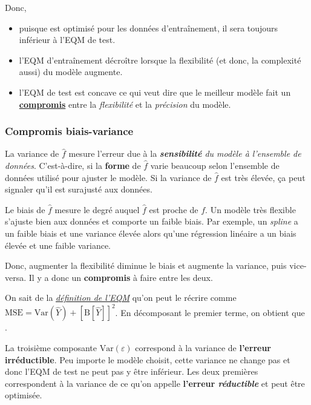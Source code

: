 \documentclass[french]{article}
\begin{document}
\begin{multicols*}{2}
Donc, 
\begin{itemize}
	\item	puisque est optimisé pour les données d'entraînement, il sera toujours inférieur à l'EQM de test.
	\item	l'EQM d'entraînement décroître lorsque la flexibilité (et donc, la complexité aussi) du modèle augmente.
	\item	l'EQM de test est concave ce qui veut dire que le meilleur modèle fait un \textbf{\underline{compromis}} entre la \textit{flexibilité} et la \textit{précision} du modèle.
\end{itemize}

\subsubsection{Compromis biais-variance}\label{subsubsec:BVtradeoff}
\begin{rappel_enhanced}[Contexte]
La variance de $\hat{f}$ mesure l'erreur due à la \textit{\textbf{sensibilité} du modèle à l'ensemble de données}. C'est-à-dire, si la \textbf{forme} de $\hat{f}$ varie beaucoup selon l'ensemble de données utilisé pour ajuster le modèle. Si la variance de $\hat{f}$ est très élevée, ça peut signaler qu'il est surajusté aux données. 

\bigskip

Le biais de $\hat{f}$ mesure le degré auquel $\hat{f}$ est proche de $f$. Un modèle très flexible s'ajuste bien aux données et comporte un faible biais. Par exemple, un \og \textit{spline} \fg{} a un faible biais et une variance élevée alors qu'une régression linéaire a un biais élevée et une faible variance.

\bigskip

Donc, augmenter la flexibilité diminue le biais et augmente la variance, puis vice-versa. Il y a donc un \textbf{compromis} à faire entre les deux.
\end{rappel_enhanced}

On sait de la \textcolor{bleudefrance}{\textit{\underline{\hyperref[subsubsec:EQMQuality]{\textcolor{bleudefrance}{définition de l'EQM}}}}} qu'on peut le récrire comme $\text{MSE} = \text{Var}(\hat{Y}) + \left[\text{B}[\hat{Y}]\right]^{2}$. En décomposant le premier terme, on obtient que .

\bigskip

La troisième composante $\text{Var}(\varepsilon)$ correspond à la variance de \textbf{l'erreur irréductible}. Peu importe le modèle choisit, cette variance ne change pas et donc l'EQM de test ne peut pas y être inférieur. Les deux premières correspondent à la variance de ce qu'on appelle \textbf{l'erreur \textit{réductible}} et peut être optimisée.


\end{multicols*}
\end{document}
